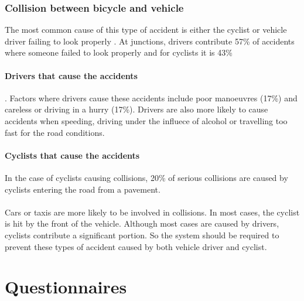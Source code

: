 \documentclass[a4paper]{report}
\begin{document}
{\subsubsection{Collision between bicycle and vehicle}

The most common cause of this type of accident is either the cyclist or vehicle driver failing to look properly \citep{cycling_accidents}. At junctions, drivers contribute 57\% of accidents where someone failed to look properly and for cyclists it is 43\%

\paragraph{Drivers that cause the accidents}. Factors where drivers cause these accidents include poor manoeuvres (17\%) and careless or driving in a hurry (17\%). Drivers are also more likely to cause accidents when speeding, driving under the influece of alcohol or travelling too fast for the road conditions.

\paragraph{Cyclists that cause the accidents}In the case of cyclists causing collisions, 20\% of serious collisions are caused by cyclists entering the road from a pavement.
 
\paragraph{} Cars or taxis are more likely to be involved in collisions. In most cases, the cyclist is hit by the front of the vehicle. Although most cases are caused by drivers, cyclists contribute a significant portion. So the system should be required to prevent these types of accident caused by both vehicle driver and cyclist.


\newpage
\section{Questionnaires}
}
\end{document}
